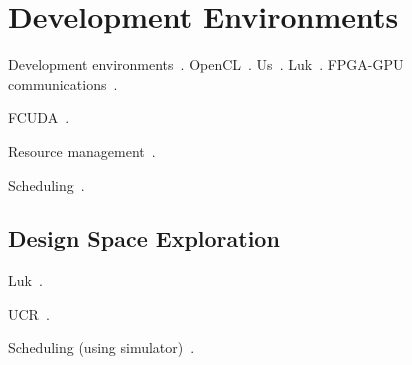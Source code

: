 \section{Development Environments}
\label{sec:dev}

Development environments~\cite{mlk12}.
OpenCL~\cite{Ahmed11}.
Us~\cite{blc17,cft+10,ctg+07,ftb+06,wcc12,wcc13}.
Luk~\cite{ttpl11}.
FPGA-GPU communications~\cite{brf14,tdm13,tdmp15}.

FCUDA~\cite{pgs+13}.

Resource management~\cite{bdm+13}.

Scheduling~\cite{lk17}.

\subsection{Design Space Exploration}

Luk~\cite{ll12,ll11,slkk13}.

UCR~\cite{bbg13}.

Scheduling (using simulator)~\cite{blby11}.
